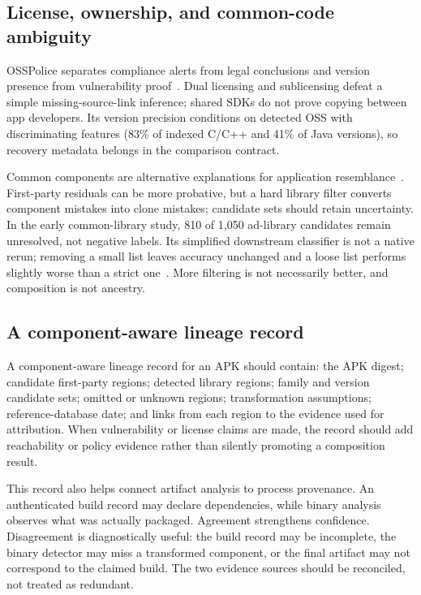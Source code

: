 \subsection{License, ownership, and common-code ambiguity}

OSSPolice separates compliance alerts from legal conclusions and version presence from vulnerability proof~\cite{osspolice}. Dual licensing and sublicensing defeat a simple missing-source-link inference; shared SDKs do not prove copying between app developers. Its version precision conditions on detected OSS with discriminating features (83\% of indexed C/C++ and 41\% of Java versions), so recovery metadata belongs in the comparison contract.

Common components are alternative explanations for application resemblance~\cite{commonlibraries}. First-party residuals can be more probative, but a hard library filter converts component mistakes into clone mistakes; candidate sets should retain uncertainty. In the early common-library study, 810 of 1,050 ad-library candidates remain unresolved, not negative labels. Its simplified downstream classifier is not a native rerun; removing a small list leaves accuracy unchanged and a loose list performs slightly worse than a strict one~\cite{commonlibraries}. More filtering is not necessarily better, and composition is not ancestry.

\subsection{A component-aware lineage record}

A component-aware lineage record for an APK should contain: the APK digest; candidate first-party regions; detected library regions; family and version candidate sets; omitted or unknown regions; transformation assumptions; reference-database date; and links from each region to the evidence used for attribution. When vulnerability or license claims are made, the record should add reachability or policy evidence rather than silently promoting a composition result.

This record also helps connect artifact analysis to process provenance. An authenticated build record may declare dependencies, while binary analysis observes what was actually packaged. Agreement strengthens confidence. Disagreement is diagnostically useful: the build record may be incomplete, the binary detector may miss a transformed component, or the final artifact may not correspond to the claimed build. The two evidence sources should be reconciled, not treated as redundant.
